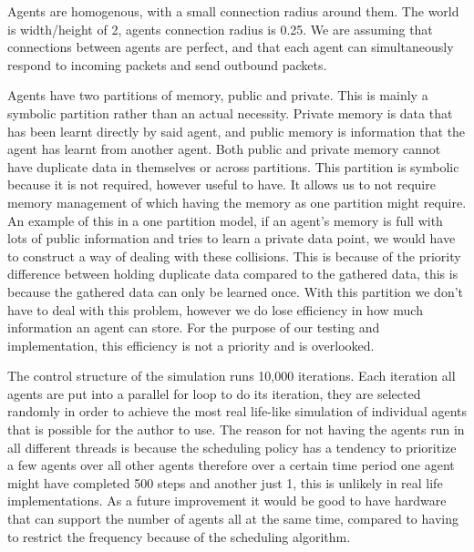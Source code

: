 \documentclass{UoYCSproject}
\begin{document}
Agents are homogenous, with a small connection radius around them. 
The world is width/height of 2, agents connection radius is 0.25. 
We are assuming that connections between agents are perfect, and that each agent can simultaneously respond to incoming packets and send outbound packets.

Agents have two partitions of memory, public and private. 
This is mainly a symbolic partition rather than an actual necessity. 
Private memory is data that has been learnt directly by said agent, and public memory is information that the agent has learnt from another agent.
Both public and private memory cannot have duplicate data in themselves or across partitions. 
This partition is symbolic because it is not required, however useful to have. 
It allows us to not require memory management of which having the memory as one partition might require. 
An example of this in a one partition model, if an agent's memory is full with lots of public information and tries to learn a private data point, we would have to construct a way of dealing with these collisions. 
This is because of the priority difference between holding duplicate data compared to the gathered data, this is because the gathered data can only be learned once. 
With this partition we don’t have to deal with this problem, however we do lose efficiency in how much information an agent can store. 
For the purpose of our testing and implementation, this efficiency is not a priority and is overlooked.

The control structure of the simulation runs 10,000 iterations. 
Each iteration all agents are put into a parallel for loop to do its iteration, they are selected randomly in order to achieve the most real life-like simulation of individual agents that is possible for the author to use. 
The reason for not having the agents run in all different threads is because the scheduling policy has a tendency to prioritize a few agents over all other agents therefore over a certain time period one agent might have completed 500 steps and another just 1, this is unlikely in real life implementations. 
As a future improvement it would be good to have hardware that can support the number of agents all at the same time, compared to having to restrict the frequency because of the scheduling algorithm.
\end{document}
